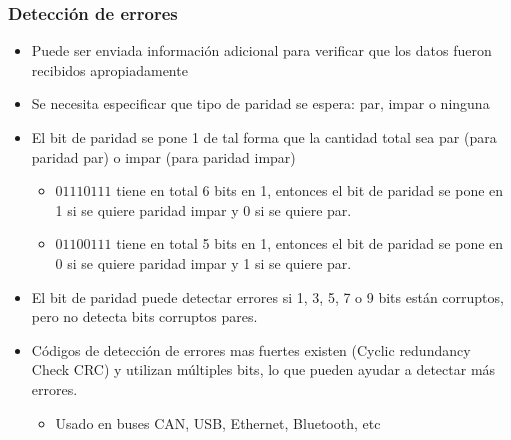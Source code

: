 \documentclass[10.5pt,scale=1.0,t,aspectratio=169,hyperref={pdfpagelabels=false}]{beamer}
\begin{document}
\begin{frame}
	\frametitle{Detección de errores}
	\begin{itemize}
		\item Puede ser enviada información adicional para verificar que los datos fueron recibidos apropiadamente
		\item Se necesita especificar que tipo de paridad se espera: par, impar o ninguna
		\item El bit de paridad se pone 1 de tal forma que la cantidad total sea par (para paridad par) o impar (para paridad impar)
		\begin{itemize}
			\item $01110111$ tiene en total 6 bits en 1, entonces el bit de paridad se pone en 1 si se quiere paridad impar y 0 si se quiere par.
			\item $01100111$ tiene en total 5 bits en 1, entonces el bit de paridad se pone en 0 si se quiere paridad impar y 1 si se quiere par.
		\end{itemize}
		\item El bit de paridad puede detectar errores si 1, 3, 5, 7 o 9 bits están corruptos, pero no detecta bits corruptos pares.
		\item Códigos de detección de errores mas fuertes existen (Cyclic redundancy Check CRC) y utilizan múltiples bits, lo que pueden ayudar a detectar más errores. 
		\begin{itemize}
			\item Usado en buses CAN, USB, Ethernet, Bluetooth, etc
		\end{itemize}
	\end{itemize}
	
\end{frame}
\end{document}
